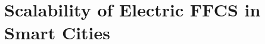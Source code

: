 
\chapter{Scalability of Electric FFCS in Smart Cities}
\label{chap:10_scalability}
	\graphicspath{{Chapter10/}}














